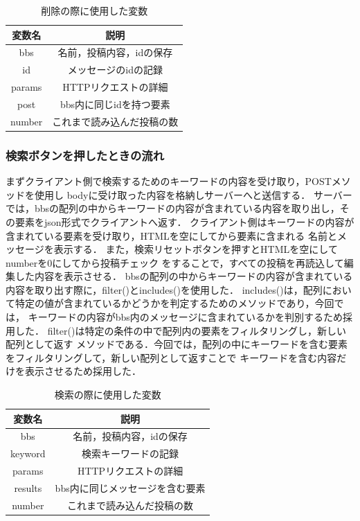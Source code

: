 \documentclass{jsarticle}
\begin{document}
\begin{table}[ht]\caption{削除の際に使用した変数}
    \centering
    \begin{tabular}{|c|c|}
       \hline
       変数名 &  説明  \\ 
        \hline
        bbs  &  名前，投稿内容，idの保存\\ \hline
        id &  メッセージのidの記録  \\ \hline
        params& HTTPリクエストの詳細 \\ \hline
        post &  bbs内に同じidを持つ要素 \\ \hline
        number   & これまで読み込んだ投稿の数  \\ \hline
    \end{tabular}
    \label{delete}
\end{table}


\subsubsection*{検索ボタンを押したときの流れ}
まずクライアント側で検索するためのキーワードの内容を受け取り，POSTメソッドを使用し
bodyに受け取った内容を格納しサーバーへと送信する．
サーバーでは，bbsの配列の中からキーワードの内容が含まれている内容を取り出し，その要素をjson形式でクライアントへ返す．
クライアント側はキーワードの内容が含まれている要素を受け取り，HTMLを空にしてから要素に含まれる
名前とメッセージを表示する．
また，検索リセットボタンを押すとHTMLを空にしてnumberを0にしてから投稿チェック
をすることで，すべての投稿を再読込して編集した内容を表示させる．
bbsの配列の中からキーワードの内容が含まれている内容を取り出す際に，filter()とincludes()を使用した．
includes()は，配列において特定の値が含まれているかどうかを判定するためのメソッドであり，今回では，
キーワードの内容がbbs内のメッセージに含まれているかを判別するため採用した．
filter()は特定の条件の中で配列内の要素をフィルタリングし，新しい配列として返す
メソッドである．今回では，配列の中にキーワードを含む要素をフィルタリングして，新しい配列として返すことで
キーワードを含む内容だけを表示させるため採用した．

\begin{table}[ht]\caption{検索の際に使用した変数}
    \centering
    \begin{tabular}{|c|c|}
       \hline
       変数名 &  説明  \\ 
        \hline
        bbs  &  名前，投稿内容，idの保存\\ \hline
        keyword &  検索キーワードの記録  \\ \hline
        params& HTTPリクエストの詳細 \\ \hline
        results &  bbs内に同じメッセージを含む要素 \\ \hline
        number   & これまで読み込んだ投稿の数  \\ \hline
    \end{tabular}
    \label{search}
\end{table}
\end{document}
